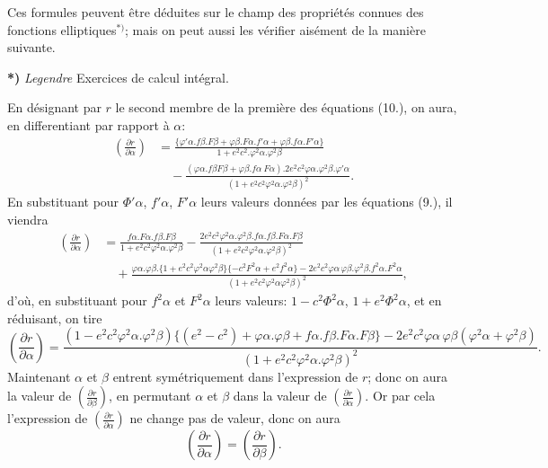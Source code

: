 \documentclass{article}
\begin{document}
Ces formules peuvent être déduites sur le champ des propriétés connues des fonctions elliptiques${}^{*)}$; mais on peut aussi les vérifier aisément de la manière suivante.

\textbf{*)} \emph{Legendre} Exercices de calcul intégral.


En désignant par $r$ le second membre de la première des équations (10.), on aura, en differentiant par rapport à $\alpha$:
\[ \begin{aligned} \left(\frac{\partial r}{\partial\alpha}\right)&=\frac{\{\varphi'\alpha.f\beta.F\beta+\varphi\beta.F\alpha.f'\alpha+\varphi\beta.f\alpha.F'\alpha\}}{1+e^{2}c^{2}.\varphi^{2}\alpha.\varphi^{2}\beta}\\ &\quad-\frac{(\varphi\alpha.f\beta F\beta+\varphi\beta.f\alpha\ F\alpha).2e^{2}c^{2}\varphi\alpha.\varphi^{2}\beta.\varphi'\alpha}{(1+e^{2}c^{2}\varphi^{2}\alpha.\varphi^{2}\beta)^{2}}. \end{aligned} \]
En substituant pour $\Phi'\alpha$, $f'\alpha$, $F'\alpha$ leurs valeurs données par les équations (9.), il viendra
\[ \begin{aligned} \left(\frac{\partial r}{\partial\alpha}\right)&=\frac{f\alpha.F\alpha.f\beta.F\beta}{1+e^{2}c^{2}\varphi^{2}\alpha.\varphi^{2}\beta}-\frac{2e^{2}c^{2}\varphi^{2}\alpha.\varphi^{2}\beta.f\alpha.f\beta.F\alpha.F\beta}{(1+e^{2}c^{2}\varphi^{2}\alpha.\varphi^{2}\beta)^{2}}\\ &\quad+\frac{\varphi\alpha.\varphi\beta.\{1+e^{2}c^{2}\varphi^{2}\alpha\varphi^{2}\beta\}\{-c^{2}F^{2}\alpha+e^{2}f^{2}\alpha\}-2e^{2}c^{2}\varphi\alpha\,\varphi\beta.\varphi^{2}\beta.f^{2}\alpha.F^{2}\alpha}{(1+e^{2}c^{2}\varphi^{2}\alpha\varphi^{2}\beta)^{2}}, \end{aligned} \]
d'où, en substituant pour $f^{2}\alpha$ et $F^{2}\alpha$ leurs valeurs: $1-c^{2}\Phi^{2}\alpha$, $1+e^{2}\Phi^{2}\alpha$, et en réduisant, on tire
\[ \left(\frac{\partial r}{\partial\alpha}\right)=\frac{(1-e^{2}c^{2}\varphi^{2}\alpha.\varphi^{2}\beta)\{(e^{2}-c^{2})+\varphi\alpha.\varphi\beta+f\alpha.f\beta.F\alpha.F\beta\}-2e^{2}c^{2}\varphi\alpha\,\varphi\beta(\varphi^{2}\alpha+\varphi^{2}\beta)}{(1+e^{2}c^{2}\varphi^{2}\alpha.\varphi^{2}\beta)^{2}}. \]
Maintenant $\alpha$ et $\beta$ entrent symétriquement dans l'expression de $r$; donc on aura la valeur de $\left(\frac{\partial r}{\partial\beta}\right)$, en permutant $\alpha$ et $\beta$ dans la valeur de $\left(\frac{\partial r}{\partial\alpha}\right)$. Or par cela l'expression de $\left(\frac{\partial r}{\partial\alpha}\right)$ ne change pas de valeur, donc on aura
\[ \left(\frac{\partial r}{\partial\alpha}\right)=\left(\frac{\partial r}{\partial\beta}\right). \]
\end{document}
